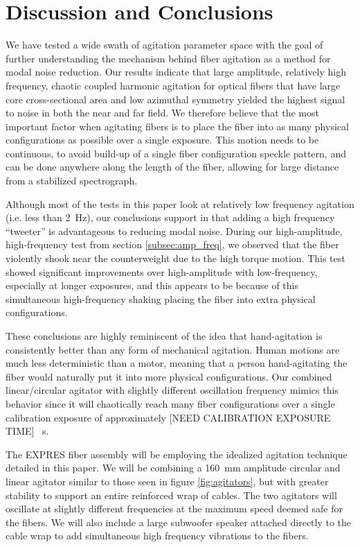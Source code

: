 \documentclass[twocolumn]{emulateapj}
\begin{document}
\section{Discussion and Conclusions}
\label{sec:conclusions}

We have tested a wide swath of agitation parameter space with the goal of further understanding the mechanism behind fiber agitation as a method for modal noise reduction. Our results indicate that large amplitude, relatively high frequency, chaotic coupled harmonic agitation for optical fibers that have large core cross-sectional area and low azimuthal symmetry yielded the highest signal to noise in both the near and far field. We therefore believe that the most important factor when agitating fibers is to place the fiber into as many physical configurations as possible over a single exposure. This motion needs to be continuous, to avoid build-up of a single fiber configuration speckle pattern, and can be done anywhere along the length of the fiber, allowing for large distance from a stabilized spectrograph.

Although most of the tests in this paper look at relatively low frequency agitation (i.e. less than \SI{2}{\hertz}), our conclusions support \cite{Plavchan2013} in that adding a high frequency ``tweeter'' is advantageous to reducing modal noise. During our high-amplitude, high-frequency test from section \ref{subsec:amp_freq}, we observed that the fiber violently shook near the counterweight due to the high torque motion. This test showed significant improvements over high-amplitude with low-frequency, especially at longer exposures, and this appears to be because of this simultaneous high-frequency shaking placing the fiber into extra physical configurations.

These conclusions are highly reminiscent of the idea that hand-agitation is consistently better than any form of mechanical agitation. Human motions are much less deterministic than a motor, meaning that a person hand-agitating the fiber would naturally put it into more physical configurations. Our combined linear/circular agitator with slightly different oscillation frequency mimics this behavior since it will chaotically reach many fiber configurations over a single calibration exposure of approximately [NEED CALIBRATION EXPOSURE TIME] \SI{}{\second}.

The EXPRES fiber assembly will be employing the idealized agitation technique detailed in this paper. We will be combining a \SI{160}{\milli\meter} amplitude circular and linear agitator similar to those seen in figure \ref{fig:agitators}, but with greater stability to support an entire reinforced wrap of cables. The two agitators will oscillate at slightly different frequencies at the maximum speed deemed safe for the fibers. We will also include a large subwoofer speaker attached directly to the cable wrap to add simultaneous high frequency vibrations to the fibers.
\end{document}
